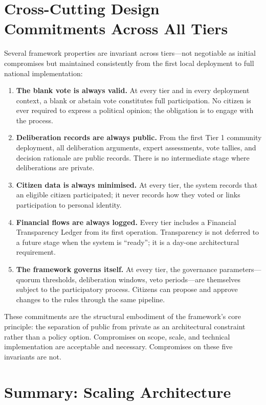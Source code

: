 \documentclass[12pt,a4paper,oneside]{report}
\begin{document}
\section{Cross-Cutting Design Commitments Across All Tiers}

Several framework properties are invariant across tiers---not negotiable as initial compromises but maintained consistently from the first local deployment to full national implementation:

\begin{enumerate}
  \item \textbf{The blank vote is always valid.} At every tier and in every deployment context, a blank or abstain vote constitutes full participation. No citizen is ever required to express a political opinion; the obligation is to engage with the process.
  \item \textbf{Deliberation records are always public.} From the first Tier 1 community deployment, all deliberation arguments, expert assessments, vote tallies, and decision rationale are public records. There is no intermediate stage where deliberations are private.
  \item \textbf{Citizen data is always minimised.} At every tier, the system records that an eligible citizen participated; it never records how they voted or links participation to personal identity.
  \item \textbf{Financial flows are always logged.} Every tier includes a Financial Transparency Ledger from its first operation. Transparency is not deferred to a future stage when the system is ``ready''; it is a day-one architectural requirement.
  \item \textbf{The framework governs itself.} At every tier, the governance parameters---quorum thresholds, deliberation windows, veto periods---are themselves subject to the participatory process. Citizens can propose and approve changes to the rules through the same pipeline.
\end{enumerate}

These commitments are the structural embodiment of the framework's core principle: the separation of public from private as an architectural constraint rather than a policy option. Compromises on scope, scale, and technical implementation are acceptable and necessary. Compromises on these five invariants are not.

\section{Summary: Scaling Architecture}
\end{document}
